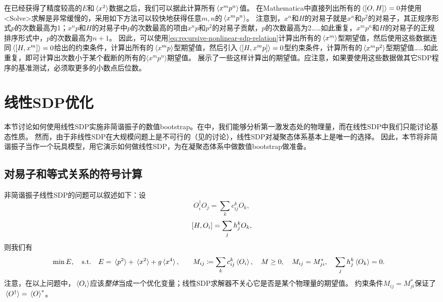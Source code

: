 \documentclass[oneside]{fduthesis}
\def\\{}%
\def\texttt#1{<#1>}%
\begin{document}
在已经获得了精度较高的$E$和$\expval*{x^2}$数据之后，我们可以据此计算所有$\expval*{x^m p^n}$值。
在Mathematica中直接列出所有的$\expval*{\comm{O}{H}} = 0$并使用\texttt{Solve}求解是非常缓慢的，采用如下方法可以较快地获得任意$m, n$的$\expval*{x^m p^n}$。
注意到，$x^n$和$H$的对易子就是$x^n$和$p^2$的对易子，其正规序形式$p$的次数最高为1；$x^n p$和$H$的对易子中$p$的次数最高的项由$x^n p$和$p^2$的对易子贡献，$p$的次数最高为2……如此重复，$x^m p^n$和$H$的对易子的正规排序形式中，$p$的次数最高为$n+1$。
因此，可以使用\eqref{eq:recursive-nonlinear-sdp-relation}计算出所有的$\expval*{x^m}$型期望值，然后使用这些数据连同$\expval*{\comm{H}{x^m}} = 0$给出的约束条件，计算出所有的$\expval*{x^m p}$型期望值，然后引入$\expval*{\comm{H}{x^m p}} = 0$型约束条件，计算所有的$\expval*{x^m p^2}$型期望值……如此重复，即可计算出次数小于某个截断的所有的$\langle x^m p^n \rangle$期望值。
展示了一些这样计算出的期望值。应注意，如果要使用这些数据做其它SDP程序的基准测试，必须取更多的小数点后位数。

\section{线性SDP优化}

本节讨论如何使用线性SDP实施非简谐振子的数值bootstrap。在中，我们能够分析第一激发态处的物理量，而在线性SDP中我们只能讨论基态性质。
然而，由于非线性SDP在大规模问题上是不可行的（见的讨论），线性SDP对凝聚态体系基本上是唯一的选择。
因此，本节将非简谐振子当作一个玩具模型，用它演示如何做线性SDP，为在凝聚态体系中做数值bootstrap做准备。

\subsection{对易子和等式关系的符号计算}

非简谐振子线性SDP的问题可以叙述如下：设
\begin{equation}
    O_i^\dagger O_j = \sum_{k} c_{ij}^k O_k,
\end{equation}
\begin{equation}
    \comm{H}{O_i} = \sum_j h_j^k O_k,
\end{equation}
则我们有
\begin{equation}
    \begin{aligned}
        &\min E, \quad \text{s.t.} \quad E = \expval*{p^2} + \expval*{x^2} + g \expval*{x^4}, \\
        &\quad M_{ij} \coloneqq \sum_k c^k_{ij} \expval*{O_i}, \quad M \geq 0, \quad M_{ij} = M_{ji}^* , \\
        &\quad \sum_j h_j^k \expval*{O_k} = 0.
    \end{aligned}
    \label{eq:oscillator-linear-sdp}
\end{equation}
注意，在以上问题中，$\expval*{O_i}$应该\emph{整体}当成一个优化变量；线性SDP求解器不关心它是否是某个物理量的期望值。
约束条件$M_{ij} = M_{ji}^*$保证了$\expval*{O^\dagger} = \expval*{O}^*$。
\end{document}
